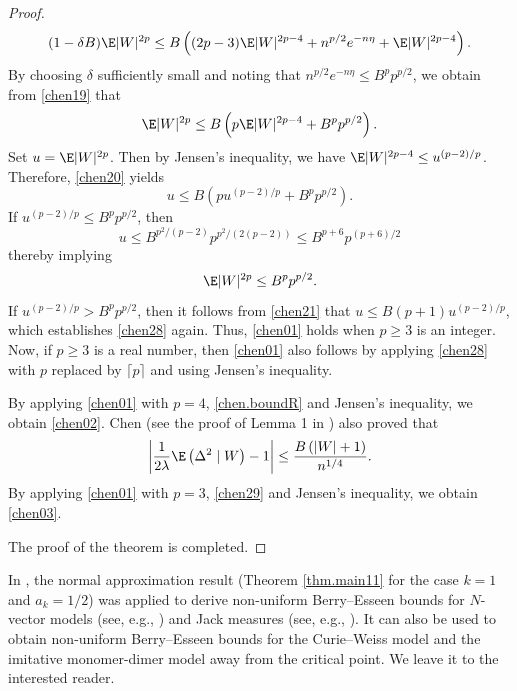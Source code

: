\begin{proof}
\begin{equation}
		(1-\delta B)\E|W|^{2p}\le 	B\left((2p-3)\E|W|^{2p-4}+n^{p/2}e^{-n\eta}+\E|W|^{2p-4}\right).
		\end{equation}
By choosing $\delta$ sufficiently small and noting that $n^{p/2}e^{-n\eta}\le B^p p^{p/2}$,
we obtain from \eqref{chen19} that
\begin{equation}\label{chen20}
	\E|W|^{2p}\le B\left(p\E|W|^{2p-4}+B^p p^{p/2}\right).
\end{equation}
Set $u=\E|W|^{2p}$. Then by Jensen's inequality, we have $\E|W|^{2p-4}\le u^{(p-2)/p}$.
Therefore, \eqref{chen20} yields
\begin{equation}\label{chen21}
u\le B\left(pu^{(p-2)/p}+B^p p^{p/2}\right).
\end{equation}
If $u^{(p-2)/p}\le B^p p^{p/2}$, then
\[u\le B^{p^2/(p-2)}p^{p^2/(2(p-2))}\le B^{p+6}p^{(p+6)/2}\]
thereby implying
\begin{equation}\label{chen28}
\E|W|^{2p}\le B^pp^{p/2}.
\end{equation}
If $u^{(p-2)/p}> B^p p^{p/2}$, then it follows from \eqref{chen21} that 
$u\le B(p+1)u^{(p-2)/p}$, which establishes \eqref{chen28} again. Thus, \eqref{chen01} holds when $p\ge 3$ is an integer.
Now, if $p\ge 3$ is a real number, then \eqref{chen01} also follows by applying \eqref{chen28} with $p$ replaced by $\lceil p \rceil$ and using Jensen's inequality.
		
By applying \eqref{chen01} with $p=4$, \eqref{chen.boundR} and Jensen's inequality, we obtain \eqref{chen02}.
		Chen \cite{chen2016limit} (see the proof of Lemma 1 in \cite{chen2016limit}) also proved that 
		\begin{equation}\label{chen29}
			\left|\frac{1}{2 \lambda} \E\left(\Delta^2 \mid W\right)-1\right| \le \frac{B\left(|W|+1\right)}{n^{1/4}}.
		\end{equation}
		By applying \eqref{chen01} with $p=3$, \eqref{chen29}  and Jensen's inequality, we obtain \eqref{chen03}.
		
		The proof of the theorem is completed.
	\end{proof}
	
	
	
	\begin{remark}
		In \cite{thanh2025non}, the normal approximation result (Theorem \ref{thm.main11} for the case $k=1$ and $a_k=1/2$) was applied to derive non-uniform Berry--Esseen bounds for $N$-vector models (see, e.g., \cite{kirkpatrick2016asymptotics,thanh2019error}) and Jack measures (see, e.g., \cite{chen2021error,fulman2004stein,fulman2011zero}). 
It can also be used to obtain non-uniform Berry--Esseen bounds for the Curie--Weiss model and the imitative monomer-dimer model away from the critical point. We leave it to the interested reader.
	\end{remark}
	

